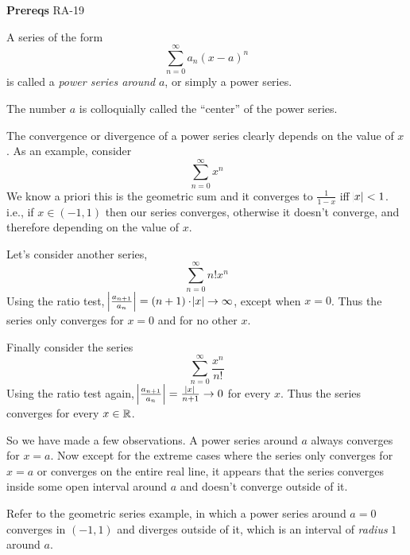

\textbf{Prereqs} RA-19
\begin{SNP}{\dfn}A series of the form
$$
\sum\limits_{n = 0}^{\infty}a_n(x - a)^n
$$
is called a \emph{power series around} $a$, or simply a power series.
\end{SNP}

The number $a$ is colloquially called the ``center'' of the power series.

The convergence or divergence of a power series clearly depends on the value of $x$. As an example, consider
$$
\sum\limits_{n = 0}^{\infty}x^n
$$
We know a priori this is the geometric sum and it converges to $\frac{1}{1 - x}$ iff $\abs{x} < 1$. i.e., if $x \in (-1, 1)$ then our series converges, otherwise it doesn't converge, and therefore depending on the value of $x$.

Let's consider another series,
$$
\sum\limits_{n = 0}^{\infty}n!x^n
$$
Using the ratio test, $\abs{\frac{a_{n + 1}}{a_n}} = (n + 1)\cdot \abs x \to \infty$, except when $x = 0$. Thus the series only converges for $x = 0$ and for no other $x$.

Finally consider the series
$$
\sum\limits_{n = 0}^{\infty}\dfrac{x^n}{n!}
$$
Using the ratio test again, $\abs{\frac{a_{n + 1}}{a_n}} = \frac{\abs x}{n + 1} \to 0$ for every $x$. Thus the series converges for every $x \in \mathbb{R}$.

So we have made a few observations. A power series around $a$ always converges for $x = a$. Now except for the extreme cases where the series only converges for $x = a$ or converges on the entire real line, it appears that the series converges inside some open interval around $a$ and doesn't converge outside of it.

Refer to the geometric series example, in which a power series around $a = 0$ converges in $(-1, 1)$ and diverges outside of it, which is an interval of \textit{radius} $1$ around $a$.

